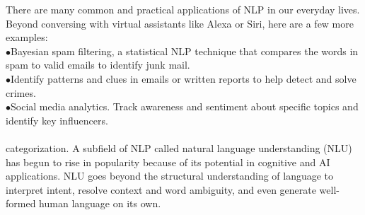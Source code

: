 There are many common and practical applications of NLP in our everyday lives. Beyond conversing with virtual assistants like Alexa or Siri, here are a few more examples:\\
\indent$\bullet$\hspace{5pt}Bayesian spam filtering, a statistical NLP technique that compares the words in spam to valid emails to identify junk mail.\\
\indent$\bullet$\hspace{5pt}Identify patterns and clues in emails or written reports to help detect and solve crimes.\\
\indent$\bullet$\hspace{5pt}Social media analytics. Track awareness and sentiment about specific topics and identify key influencers.\\\\
categorization.
A subfield of NLP called natural language understanding (NLU) has begun to rise in popularity because of its potential in cognitive and AI applications. NLU goes beyond the structural understanding of language to interpret intent, resolve context and word ambiguity, and even generate well-formed human language on its own. 